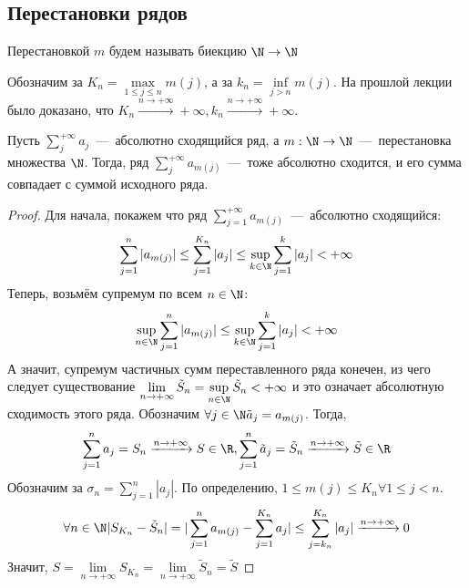 \subsection{Перестановки рядов}
\begin{definition}
    Перестановкой $m$ будем называть биекцию $\N \rightarrow \N$
\end{definition}
\begin{note}
    Обозначим за $K_n = \max\limits_{1 \leq j \leq n} m(j)$, а за $k_n = \inf\limits_{j > n} m(j)$. На прошлой лекции было доказано, что $K_n \xrightarrow{n \rightarrow +\infty} +\infty, k_n \xrightarrow{n \rightarrow +\infty} +\infty$.
\end{note}

\begin{theorem}
    Пусть $\sum\limits_{j}^{+\infty} a_j$~---~абсолютно сходящийся ряд, а $m: \N \rightarrow \N$~---~перестановка множества $\N$. Тогда, ряд $\sum\limits_{j}^{+\infty} a_{m(j)}$~---~тоже абсолютно сходится, и его сумма совпадает с суммой исходного ряда.
\end{theorem}
\begin{proof}
    Для начала, покажем что ряд $\sum\limits_{j = 1}^{+\infty} a_{m(j)}$~---~абсолютно сходящийся: 
    \[\sum\limits_{j = 1}^{n}|a_{m(j)}| \leq \sum\limits_{j = 1}^{K_n}|a_j| \leq \sup\limits_{k \in \N} \sum\limits_{j = 1}^k |a_j| < +\infty\]
    Теперь, возьмём супремум по всем $n \in \N$:
    \[\sup\limits_{n \in \N} \sum\limits_{j = 1}^n |a_{m(j)}| \leq \sup\limits_{k \in \N} \sum\limits_{j = 1}^k |a_j| < +\infty\]
    А значит, супремум частичных сумм переставленного ряда конечен, из чего следует существование $\lim\limits_{n \rightarrow +\infty} \tilde{S}_n = \sup\limits_{n \in \N} \tilde{S}_n < +\infty$ и это означает абсолютную сходимость этого ряда.
    Обозначим $\forall j \in \N \tilde{a}_j = a_{m(j)}$.
    Тогда, 
    \[\sum\limits_{j = 1}^n a_j = S_n \xrightarrow{n \rightarrow + \infty} S \in \R, \sum\limits_{j = 1}^n \tilde{a}_j = \tilde{S}_n \xrightarrow{n \rightarrow + \infty} \tilde{S} \in \R\] Обозначим за $\sigma_n = \sum\limits_{j = 1}^n |a_j|$. По определению, $1 \leq m(j) \leq K_n \forall 1 \leq j < n$.
    \[\forall n \in \N |S_{K_n} - \tilde{S}_n| = |\sum\limits_{j = 1}^n a_{m(j)} - \sum\limits_{j = 1}^{K_n} a_j| \leq \sum\limits_{j = k_n}^{K_n}|a_j| \xrightarrow{n \rightarrow +\infty} 0\]
    Значит, $S = \lim\limits_{n \rightarrow +\infty} S_{K_n} = \lim\limits_{n \rightarrow +\infty} \tilde{S}_n = \tilde{S}$
\end{proof}

